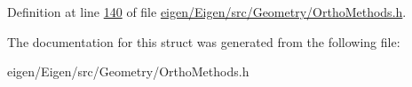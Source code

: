 Definition at line \hyperlink{eigen_2_eigen_2src_2_geometry_2_ortho_methods_8h_source_l00140}{140} of file \hyperlink{eigen_2_eigen_2src_2_geometry_2_ortho_methods_8h_source}{eigen/\+Eigen/src/\+Geometry/\+Ortho\+Methods.\+h}.



The documentation for this struct was generated from the following file\+:\begin{DoxyCompactItemize}
\item 
eigen/\+Eigen/src/\+Geometry/\+Ortho\+Methods.\+h\end{DoxyCompactItemize}
